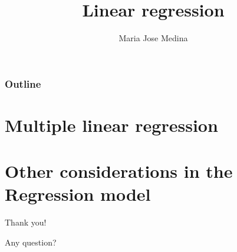 \documentclass[10pt]{beamer}
\title{Linear regression}%
\author[Maria Jose Medina]{Maria Jose Medina}%
\institute[USACH]{Universidad de Santiago de Chile}
\date[\textcolor{white}{September 2022}]
\begin{document}
\frame{\titlepage}
\begin{frame}
\frametitle{Outline}
\tableofcontents
\end{frame}



\section{Multiple linear regression}


\section{Other considerations in the Regression model}




\begin{frame}

\textcolor{myNewColorA}{\huge{\centerline{Thank you!}}}
\vspace*{0.5cm}

\textcolor{myNewColorA}{\Large{\centerline{Any question?}}}
\vspace*{0.5cm}


\end{frame}
\end{document}
